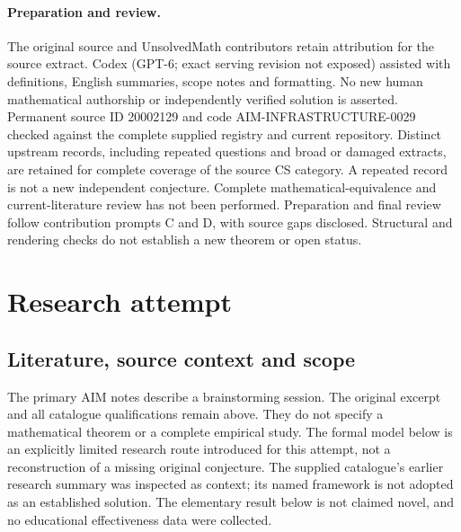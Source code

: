 \documentclass[11pt]{article}
\begin{document}
\paragraph{Preparation and review.}
The original source and UnsolvedMath contributors retain attribution for the source extract. Codex (GPT-6; exact serving revision not exposed) assisted with definitions, English summaries, scope notes and formatting. No new human mathematical authorship or independently verified solution is asserted. Permanent source ID 20002129 and code AIM-INFRASTRUCTURE-0029 checked against the complete supplied registry and current repository. Distinct upstream records, including repeated questions and broad or damaged extracts, are retained for complete coverage of the source CS category. A repeated record is not a new independent conjecture. Complete mathematical-equivalence and current-literature review has not been performed. Preparation and final review follow contribution prompts C and D, with source gaps disclosed. Structural and rendering checks do not establish a new theorem or open status.
\label{end:20002129}

\section{Research attempt}
\subsection{Literature, source context and scope}
The primary AIM notes describe a brainstorming session. The original excerpt and all catalogue qualifications remain above. They do not specify a mathematical theorem or a complete empirical study. The formal model below is an explicitly limited research route introduced for this attempt, not a reconstruction of a missing original conjecture. The supplied catalogue's earlier research summary was inspected as context; its named framework is not adopted as an established solution. The elementary result below is not claimed novel, and no educational effectiveness data were collected.
\end{document}
